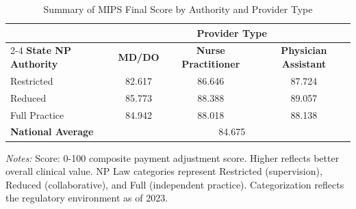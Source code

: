 \begin{table}[htbp]
    \centering
    \caption{Summary of MIPS Final Score by Authority and Provider Type}
    \label{tab:mips_final_score_provtype}
    \vspace{0.2cm}
    \begin{tabular}{lccc}
        \toprule
        & \multicolumn{3}{c}{\textbf{Provider Type}} \\
        \cmidrule(lr){2-4}
        \textbf{State NP Authority} & \textbf{MD/DO} & \textbf{Nurse Practitioner} & \textbf{Physician Assistant} \\
        \midrule
        Restricted & 82.617 & 86.646 & 87.724 \\
        Reduced & 85.773 & 88.388 & 89.057 \\
        Full Practice & 84.942 & 88.018 & 88.138 \\
        \midrule
        \textbf{National Average} & \multicolumn{3}{c}{84.675} \\
        \bottomrule
    \end{tabular}
    \vspace{0.1cm}
    \begin{minipage}{0.85\textwidth}
        \footnotesize \textit{Notes:} Score: 0-100 composite payment adjustment score. Higher reflects better overall clinical value. NP Law categories represent Restricted (supervision), Reduced (collaborative), and Full (independent practice). Categorization reflects the regulatory environment as of 2023.
    \end{minipage}
\end{table}